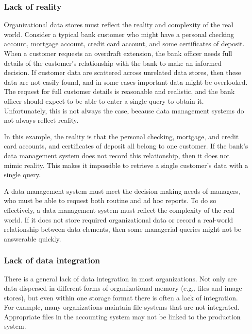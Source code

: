 \documentclass[
]{article}
\begin{document}
\hypertarget{lack-of-reality}{%
\subsubsection*{Lack of reality}\label{lack-of-reality}}

Organizational data stores must reflect the reality and complexity of
the real world. Consider a typical bank customer who might have a
personal checking account, mortgage account, credit card account, and
some certificates of deposit. When a customer requests an overdraft
extension, the bank officer needs full details of the customer's
relationship with the bank to make an informed decision. If customer
data are scattered across unrelated data stores, then these data are not
easily found, and in some cases important data might be overlooked. The
request for full customer details is reasonable and realistic, and the
bank officer should expect to be able to enter a single query to obtain
it. Unfortunately, this is not always the case, because data management
systems do not always reflect reality.

In this example, the reality is that the personal checking, mortgage,
and credit card accounts, and certificates of deposit all belong to one
customer. If the bank's data management system does not record this
relationship, then it does not mimic reality. This makes it impossible
to retrieve a single customer's data with a single query.

A data management system must meet the decision making needs of
managers, who must be able to request both routine and ad hoc reports.
To do so effectively, a data management system must reflect the
complexity of the real world. If it does not store required
organizational data or record a real-world relationship between data
elements, then some managerial queries might not be answerable quickly.

\hypertarget{lack-of-data-integration}{%
\subsubsection*{Lack of data integration}\label{lack-of-data-integration}}

There is a general lack of data integration in most organizations. Not
only are data dispersed in different forms of organizational memory
(e.g., files and image stores), but even within one storage format there
is often a lack of integration. For example, many organizations maintain
file systems that are not integrated. Appropriate files in the
accounting system may not be linked to the production system.
\end{document}
